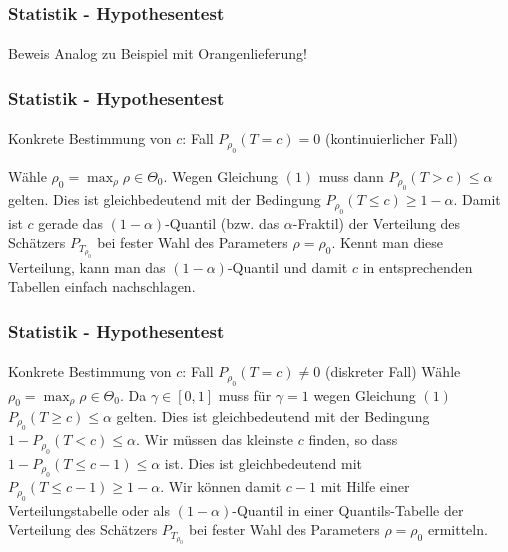 \documentclass{beamer}
\begin{document}
\begin{frame}
    \frametitle{Statistik - Hypothesentest}
\framesubtitle{}

\begin{block}{Beweis}
Analog zu  Beispiel mit Orangenlieferung!
\end{block}

 \end{frame}

\begin{frame}
    \frametitle{Statistik - Hypothesentest}
\framesubtitle{}

\begin{block}{Konkrete Bestimmung von $c$: Fall  $P_{\rho_0}(T  = c) = 0$ (kontinuierlicher Fall)}

Wähle $\rho_0 = \max_{\rho} \rho \in \Theta_0$. Wegen  Gleichung $(1)$   muss dann $P_{\rho_0}(T  > c) \leq \alpha$ gelten.  Dies ist gleichbedeutend mit der Bedingung $P_{\rho_0}(T  \leq c)  \geq 1 - \alpha$. Damit ist $c$ gerade das $(1-\alpha)$-Quantil (bzw. das $\alpha$-Fraktil) der Verteilung des Schätzers $P_{T_{\rho_0}}$ bei fester Wahl des Parameters $\rho = \rho_0$. Kennt man diese Verteilung, kann man das  $(1-\alpha)$-Quantil und damit $c$ in entsprechenden Tabellen einfach nachschlagen.  
\end{block}


 \end{frame}
\begin{frame}
    \frametitle{Statistik - Hypothesentest}
\framesubtitle{}

\begin{block}{Konkrete Bestimmung von $c$: Fall  $P_{\rho_0}(T  = c) \neq 0$ (diskreter Fall)}
Wähle $\rho_0 = \max_{\rho} \rho \in \Theta_0$. Da $\gamma \in [0,1]$ muss  für $\gamma =1$ wegen Gleichung $(1)$  $P_{\rho_0}(T  \geq c)  \leq \alpha$ gelten.  Dies ist gleichbedeutend mit der Bedingung $1 - P_{\rho_0}(T  < c)  \leq \alpha$. Wir müssen das kleinste $c$ finden, so dass $1 - P_{\rho_0}(T  \leq c -1)  \leq \alpha$ ist.  Dies ist gleichbedeutend mit  $P_{\rho_0}(T  \leq c -1)  \geq 1- \alpha$. Wir können damit $c-1$ mit Hilfe einer Verteilungstabelle oder als $(1-\alpha)$-Quantil in einer Quantils-Tabelle  der Verteilung des Schätzers $P_{T_{\rho_0}}$ bei fester Wahl des Parameters $\rho = \rho_0$ ermitteln.

\end{block}


 \end{frame}
\end{document}
